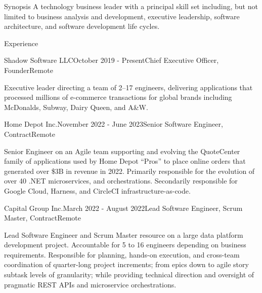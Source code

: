 \documentclass{resume} %
\begin{document}
	
	\begin{rSection}{Synopsis}
		A technology business leader with a principal skill set including, but not limited to business analysis and development, executive leadership, software architecture, and software development life cycles.
	\end{rSection}
	
	
	\begin{rSection}{Experience}
		
		\begin{rSubsection}{Shadow Software LLC}{October 2019 - Present}{Chief Executive Officer, Founder}{Remote}
			\item[] Executive leader directing a team of 2--17 engineers, delivering applications that processed millions of e-commerce transactions for global brands including McDonalds, Subway, Dairy Queen, and A\&W.
		\end{rSubsection}
		
		\begin{rSubsection}{Home Depot Inc.}{November 2022 - June 2023}{Senior Software Engineer, Contract}{Remote}
			\item[] Senior Engineer on an Agile team supporting and evolving the QuoteCenter family of applications used by Home Depot “Pros” to place online orders that generated over \$3B in revenue in 2022. Primarily responsible for the evolution of over 40 .NET microservices, and orchestrations. Secondarily responsible for Google Cloud, Harness, and CircleCI infrastructure-as-code.
		\end{rSubsection}
		
		\begin{rSubsection}{Capital Group Inc.}{March 2022 - August 2022}{Lead Software Engineer, Scrum Master, Contract}{Remote}
			\item[] Lead Software Engineer and Scrum Master resource on a large data platform development project. Accountable for 5 to 16 engineers depending on business requirements. Responsible for planning, hands-on execution, and cross-team coordination of quarter-long project increments; from epics down to agile story subtask levels of granularity; while providing technical direction and oversight of pragmatic REST APIs and microservice orchestrations.
		\end{rSubsection}
		

\end{rSection}
\end{document}
